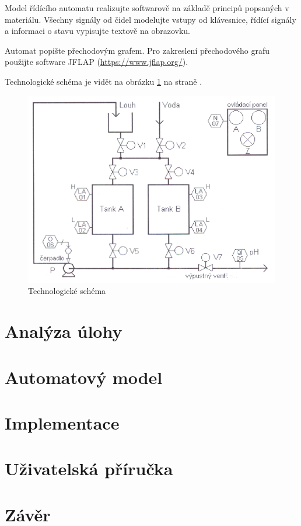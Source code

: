 \documentclass[12pt]{report}
\begin{document}
	Model řídícího automatu realizujte softwarově na základě principů popsaných v materiálu. Všechny signály od čidel modelujte vstupy od klávesnice, řídící signály a informaci o stavu vypisujte textově na obrazovku.
	
	Automat popište přechodovým grafem. Pro zakreslení přechodového grafu použijte software JFLAP (\href{https://www.jflap.org/}{https://www.jflap.org/}).
	
	Technologické schéma je vidět na obrázku \ref{fig:schema} na straně \pageref{fig:schema}.
	
	
	\begin{figure}
		\centering
		\includegraphics[width=0.6\textheight]{schema}
		\caption{Technologické schéma}
		\label{fig:schema}
	\end{figure}
	
	\chapter{Analýza úlohy}
	
	\chapter{Automatový model}
	
	\chapter{Implementace}
	
	\chapter{Uživatelská příručka}
	
	\chapter{Závěr}
	
\end{document}
